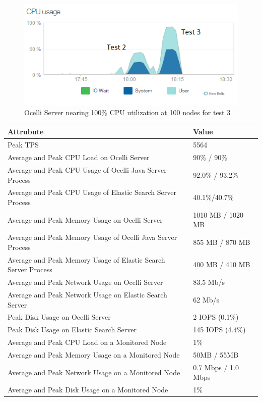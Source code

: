 \documentclass{llncs}
\begin{document}
\begin{figure}[h]
    \centering
    \includegraphics[scale=0.7]{app13}
    \caption{Ocelli Server nearing 100\% CPU utilization at 100 nodes for test 3}
    \label{fig:ocelli_dm}
\end{figure}

\begin{flushleft}
    \begin{tabular}{ | l | l |}
    \hline
  Attrubute & Value  \\ \hline
  Peak TPS & 5564  \\ \hline
  Average and Peak CPU Load on Ocelli Server &90\% / 90\%  \\ \hline
  Average and Peak CPU Usage of Ocelli Java Server Process & 92.0\% / 93.2\% \\ \hline
 Average and Peak CPU Usage of Elastic Search Server Process & 40.1\%/40.7\%	  \\ \hline
  Average and Peak Memory Usage on Ocelli Server & 1010 MB / 1020 MB	 \\ \hline
  Average and Peak Memory Usage of Ocelli Java Server Process &	855 MB / 870 MB		 \\ \hline
 Average and Peak Memory Usage of Elastic Search Server Process &	400 MB / 410 MB		 \\ \hline
Average and Peak Network Usage on Ocelli Server &	83.5 Mb/s 	 \\ \hline
Average and Peak Network Usage on Elastic Search Server & 62 Mb/s 	 \\ \hline
Peak Disk Usage on Ocelli Server &	2 IOPS (0.1\%)		 \\ \hline
Peak Disk Usage on Elastic Search Server &	145 IOPS (4.4\%)		 \\ \hline
Average and Peak CPU Load on a Monitored Node& 	1\% 	 \\ \hline
  Average and Peak Memory Usage on a Monitored Node &	50MB / 55MB	 \\ \hline
Average and Peak Network Usage on a Monitored Node &	0.7 Mbps / 1.0 Mbps		 \\ \hline
  Average and Peak Disk Usage on a Monitored Node &  1\%	\\ 
    \hline
    \end{tabular}
\end{flushleft}
\end{document}
